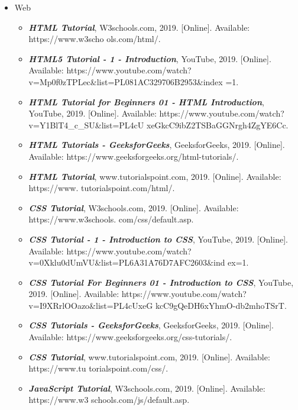 \documentclass[12pt, a4paper]{report}
\begin{document}
\begin{itemize}
    \item Web
    
    \begin{itemize}
    \item \textit{\textbf{HTML Tutorial}}, W3schools.com, 2019. [Online]. Available: https://www.w3scho ols.com/html/. 
    
    \item \textit{\textbf{HTML5 Tutorial - 1 - Introduction}}, YouTube, 2019. [Online]. Available: https://www.youtube.com/watch?v=Mp0f0zTPLec&list=PL081AC329706B2953&index =1. 
    
    \item \textit{\textbf{HTML Tutorial for Beginners 01 - HTML Introduction}}, YouTube, 2019. [Online]. Available: https://www.youtube.com/watch?v=Y1BlT4{\_}c{\_}SU&list=PL4cU xeGkcC9ibZ2TSBaGGNrgh4ZgYE6Cc.
   
    \item \textit{\textbf{HTML Tutorials - GeeksforGeeks}}, GeeksforGeeks, 2019. [Online]. Available: https://www.geeksforgeeks.org/html-tutorials/.

    \item \textit{\textbf{HTML Tutorial}}, www.tutorialspoint.com, 2019. [Online]. Available: https://www. tutorialspoint.com/html/. 

    \item \textit{\textbf{CSS Tutorial}}, W3schools.com, 2019. [Online]. Available: https://www.w3schools. com/css/default.asp. 

    \item \textit{\textbf{CSS Tutorial - 1 - Introduction to CSS}}, YouTube, 2019. [Online]. Available: https://www.youtube.com/watch?v=0Xklu0dUmVU&list=PL6A31A76D7AFC2603&ind ex=1. 

    \item \textit{\textbf{CSS Tutorial For Beginners 01 - Introduction to CSS}}, YouTube, 2019. [Online]. Available: https://www.youtube.com/watch?v=I9XRrlOOazo&list=PL4cUxeG kcC9gQeDH6xYhmO-db2mhoTSrT. 

    \item \textit{\textbf{CSS Tutorials - GeeksforGeeks}}, GeeksforGeeks, 2019. [Online]. Available: https://www.geeksforgeeks.org/css-tutorials/. 

    \item \textit{\textbf{CSS Tutorial}}, www.tutorialspoint.com, 2019. [Online]. Available: https://www.tu torialspoint.com/css/. 

    \item \textit{\textbf{JavaScript Tutorial}}, W3schools.com, 2019. [Online]. Available: https://www.w3 schools.com/js/default.asp. 


\end{itemize}
\end{itemize}
\end{document}
